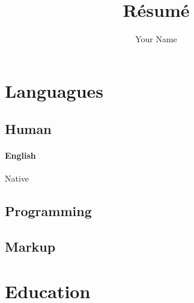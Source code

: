 



\title{R\'esum\'e}
\author{Your Name}

\maketitle

\section{Languagues}
\subsection{Human}
\paragraph{English} Native
\subsection{Programming}
\subsection{Markup}

\section{Education}
\subsection{}


